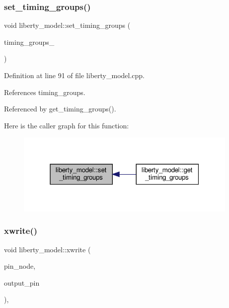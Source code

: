 \subsubsection{\texorpdfstring{set\+\_\+timing\+\_\+groups()}{set\_timing\_groups()}}
{\footnotesize\ttfamily void liberty\+\_\+model\+::set\+\_\+timing\+\_\+groups (\begin{DoxyParamCaption}\item[{const std\+::map$<$ std\+::string, std\+::map$<$ \hyperlink{classCustomOrderedSet}{Custom\+Ordered\+Set}$<$ std\+::string $>$, \hyperlink{timing__group_8hpp_a343803fe4e1a65fd6b57b504c2ed67ca}{timing\+\_\+group\+Ref} $>$$>$ \&}]{timing\+\_\+groups\+\_\+ }\end{DoxyParamCaption})}



Definition at line 91 of file liberty\+\_\+model.\+cpp.



References timing\+\_\+groups.



Referenced by get\+\_\+timing\+\_\+groups().

Here is the caller graph for this function\+:
\nopagebreak
\begin{figure}[H]
\begin{center}
\leavevmode
\includegraphics[width=304pt]{d0/dae/classliberty__model_a2ee7986501fabaf63a98e36e3462b034_icgraph}
\end{center}
\end{figure}
\mbox{\label{classliberty__model_ac02327c2851bea22b94377da3b0b689a}} 
\subsubsection{\texorpdfstring{xwrite()}{xwrite()}}
{\footnotesize\ttfamily void liberty\+\_\+model\+::xwrite (\begin{DoxyParamCaption}\item[{\hyperlink{classxml__element}{xml\+\_\+element} $\ast$}]{pin\+\_\+node,  }\item[{const std\+::string \&}]{output\+\_\+pin }\end{DoxyParamCaption})\hspace{0.3cm}{\ttfamily [override]}, {\ttfamily [virtual]}}



